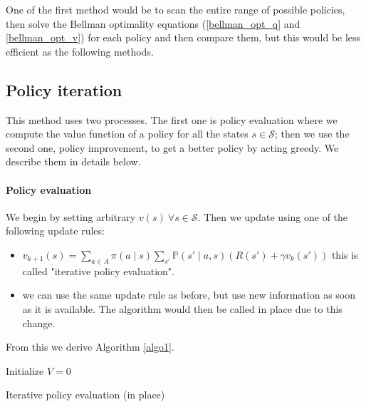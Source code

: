 \documentclass[14pt,a4paper]{article}
\theoremstyle{definition}
\begin{document}
One of the first method would be to scan the entire range of possible policies, then solve the Bellman optimality equations (\eqref{bellman_opt_q} and \eqref{bellman_opt_v}) for each policy and then compare them, but this would be less efficient as the following methods.

\subsection{Policy iteration}

This method uses two processes. The first one is policy evaluation where we compute the value function of a policy for all the states $s \in \mathcal{S} $; then we use the second one, policy improvement, to get a better policy by acting greedy. We describe them in details below.
\paragraph{Policy evaluation} 


We begin by setting arbitrary $v(s) \ \forall s \in \mathcal{S}$.
Then we update using one of the following update rules: 

\begin{itemize}
\item $v_{k+1}(s)=\underset{a \in A}{\sum}\pi(a \mid s)\underset{s'}{\sum}\mathbb{P}(s'\mid a,s)(R(s')+\gamma v_k(s'))$ \quad this is called "iterative policy evaluation".
\item we can use the same update rule as before, but use new information as soon as it is available. The algorithm would then be called in place due to this change.
\end{itemize}

From this we derive Algorithm \ref{algo1}.


\begin{algorithm}


    Initialize $V = 0$\\
    
    \caption{Iterative policy evaluation (in place)}
    \label{algo1}
\end{algorithm}
\end{document}
